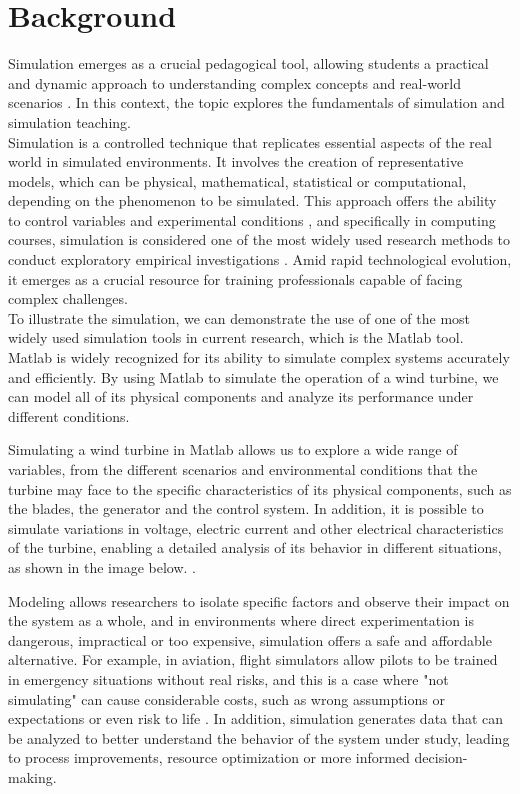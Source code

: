 \section{Background}
\label{sec:background}

Simulation emerges as a crucial pedagogical tool, allowing students a practical and dynamic approach to understanding complex concepts and real-world scenarios \cite{chwif2006modelagem}. In this context, the topic explores the fundamentals of simulation and simulation teaching.
\\

Simulation is a controlled technique that replicates essential aspects of the real world in simulated environments. It involves the creation of representative models, which can be physical, mathematical, statistical or computational, depending on the phenomenon to be simulated. This approach offers the ability to control variables and experimental conditions \cite{reichard1992computer}, and specifically in computing courses, simulation is considered one of the most widely used research methods to conduct exploratory empirical investigations \cite{Molleri:2016:SGS:2961111.2962619}. Amid rapid technological evolution, it emerges as a crucial resource for training professionals capable of facing complex challenges. \\

To illustrate the simulation, we can demonstrate the use of one of the most widely used simulation tools in current research, which is the Matlab tool. Matlab is widely recognized for its ability to simulate complex systems accurately and efficiently. By using Matlab to simulate the operation of a wind turbine, we can model all of its physical components and analyze its performance under different conditions.

Simulating a wind turbine in Matlab allows us to explore a wide range of variables, from the different scenarios and environmental conditions that the turbine may face to the specific characteristics of its physical components, such as the blades, the generator and the control system. In addition, it is possible to simulate variations in voltage, electric current and other electrical characteristics of the turbine, enabling a detailed analysis of its behavior in different situations, as shown in the image below. \cite{souza2022simulador}.


Modeling allows researchers to isolate specific factors and observe their impact on the system as a whole, and in environments where direct experimentation is dangerous, impractical or too expensive, simulation offers a safe and affordable alternative. For example, in aviation, flight simulators allow pilots to be trained in emergency situations without real risks, and this is a case where "not simulating" can cause considerable costs, such as wrong assumptions or expectations or even risk to life \cite{DBLP:conf/ispw/Birkholzer12}. In addition, simulation generates data that can be analyzed to better understand the behavior of the system under study, leading to process improvements, resource optimization or more informed decision-making.

